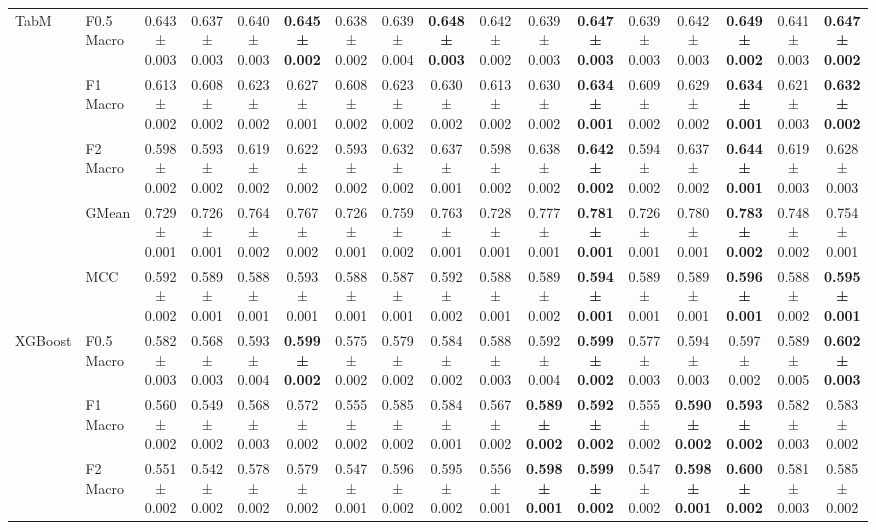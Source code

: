 \begin{table}[H]
{\begin{tabular}{llccccccccccccccc}
\cline{1-17}
\multirow[t]{5}{*}{TabM} & F0.5 Macro & 0.643 ± 0.003 & 0.637 ± 0.003 & 0.640 ± 0.003 & \textbf{0.645 ± 0.002} & 0.638 ± 0.002 & 0.639 ± 0.004 & \textbf{0.648 ± 0.003} & 0.642 ± 0.002 & 0.639 ± 0.003 & \textbf{0.647 ± 0.003} & 0.639 ± 0.003 & 0.642 ± 0.003 & \textbf{0.649 ± 0.002} & 0.641 ± 0.003 & \textbf{0.647 ± 0.002} \\
 & F1 Macro & 0.613 ± 0.002 & 0.608 ± 0.002 & 0.623 ± 0.002 & 0.627 ± 0.001 & 0.608 ± 0.002 & 0.623 ± 0.002 & 0.630 ± 0.002 & 0.613 ± 0.002 & 0.630 ± 0.002 & \textbf{0.634 ± 0.001} & 0.609 ± 0.002 & 0.629 ± 0.002 & \textbf{0.634 ± 0.001} & 0.621 ± 0.003 & \textbf{0.632 ± 0.002} \\
 & F2 Macro & 0.598 ± 0.002 & 0.593 ± 0.002 & 0.619 ± 0.002 & 0.622 ± 0.002 & 0.593 ± 0.002 & 0.632 ± 0.002 & 0.637 ± 0.001 & 0.598 ± 0.002 & 0.638 ± 0.002 & \textbf{0.642 ± 0.002} & 0.594 ± 0.002 & 0.637 ± 0.002 & \textbf{0.644 ± 0.001} & 0.619 ± 0.003 & 0.628 ± 0.003 \\
 & GMean & 0.729 ± 0.001 & 0.726 ± 0.001 & 0.764 ± 0.002 & 0.767 ± 0.002 & 0.726 ± 0.001 & 0.759 ± 0.002 & 0.763 ± 0.001 & 0.728 ± 0.001 & 0.777 ± 0.001 & \textbf{0.781 ± 0.001} & 0.726 ± 0.001 & 0.780 ± 0.001 & \textbf{0.783 ± 0.002} & 0.748 ± 0.002 & 0.754 ± 0.001 \\
 & MCC & 0.592 ± 0.002 & 0.589 ± 0.001 & 0.588 ± 0.001 & 0.593 ± 0.001 & 0.588 ± 0.001 & 0.587 ± 0.001 & 0.592 ± 0.002 & 0.588 ± 0.001 & 0.589 ± 0.002 & \textbf{0.594 ± 0.001} & 0.589 ± 0.001 & 0.589 ± 0.001 & \textbf{0.596 ± 0.001} & 0.588 ± 0.002 & \textbf{0.595 ± 0.001} \\
\cline{1-17}
\multirow[t]{5}{*}{XGBoost} & F0.5 Macro & 0.582 ± 0.003 & 0.568 ± 0.003 & 0.593 ± 0.004 & \textbf{0.599 ± 0.002} & 0.575 ± 0.002 & 0.579 ± 0.002 & 0.584 ± 0.002 & 0.588 ± 0.003 & 0.592 ± 0.004 & \textbf{0.599 ± 0.002} & 0.577 ± 0.003 & 0.594 ± 0.003 & 0.597 ± 0.002 & 0.589 ± 0.005 & \textbf{0.602 ± 0.003} \\
 & F1 Macro & 0.560 ± 0.002 & 0.549 ± 0.002 & 0.568 ± 0.003 & 0.572 ± 0.002 & 0.555 ± 0.002 & 0.585 ± 0.002 & 0.584 ± 0.001 & 0.567 ± 0.002 & \textbf{0.589 ± 0.002} & \textbf{0.592 ± 0.002} & 0.555 ± 0.002 & \textbf{0.590 ± 0.002} & \textbf{0.593 ± 0.002} & 0.582 ± 0.003 & 0.583 ± 0.002 \\
 & F2 Macro & 0.551 ± 0.002 & 0.542 ± 0.002 & 0.578 ± 0.002 & 0.579 ± 0.002 & 0.547 ± 0.001 & 0.596 ± 0.002 & 0.595 ± 0.002 & 0.556 ± 0.001 & \textbf{0.598 ± 0.001} & \textbf{0.599 ± 0.002} & 0.547 ± 0.002 & \textbf{0.598 ± 0.001} & \textbf{0.600 ± 0.002} & 0.581 ± 0.003 & 0.585 ± 0.002 \\

\end{tabular}}
\end{table}
